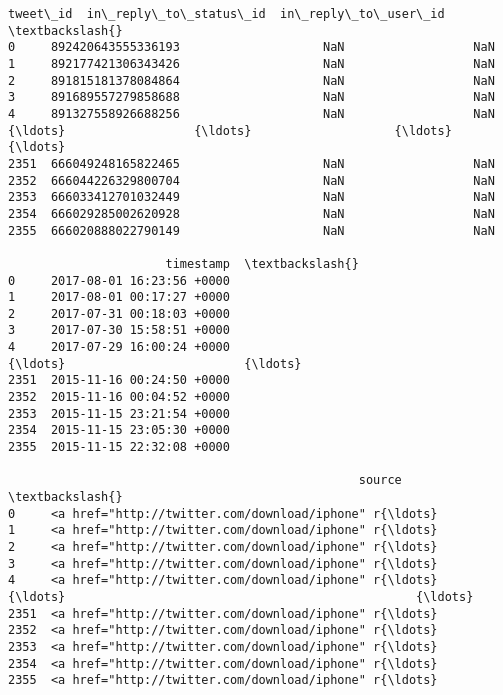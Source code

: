 \documentclass[11pt]{article}
\makeatletter
\newcommand{\boxspacing}{\kern\kvtcb@left@rule\kern\kvtcb@boxsep}
\newcommand{\prompt}[4]{
        {\ttfamily\llap{{\color{#2}[#3]:\hspace{3pt}#4}}\vspace{-\baselineskip}}
    }
\makeatother
\begin{document}
            \begin{tcolorbox}[breakable, size=fbox, boxrule=.5pt, pad at break*=1mm, opacityfill=0]
\prompt{Out}{outcolor}{7}{\boxspacing}
\begin{Verbatim}[commandchars=\\\{\}]
                tweet\_id  in\_reply\_to\_status\_id  in\_reply\_to\_user\_id  \textbackslash{}
0     892420643555336193                    NaN                  NaN
1     892177421306343426                    NaN                  NaN
2     891815181378084864                    NaN                  NaN
3     891689557279858688                    NaN                  NaN
4     891327558926688256                    NaN                  NaN
{\ldots}                  {\ldots}                    {\ldots}                  {\ldots}
2351  666049248165822465                    NaN                  NaN
2352  666044226329800704                    NaN                  NaN
2353  666033412701032449                    NaN                  NaN
2354  666029285002620928                    NaN                  NaN
2355  666020888022790149                    NaN                  NaN

                      timestamp  \textbackslash{}
0     2017-08-01 16:23:56 +0000
1     2017-08-01 00:17:27 +0000
2     2017-07-31 00:18:03 +0000
3     2017-07-30 15:58:51 +0000
4     2017-07-29 16:00:24 +0000
{\ldots}                         {\ldots}
2351  2015-11-16 00:24:50 +0000
2352  2015-11-16 00:04:52 +0000
2353  2015-11-15 23:21:54 +0000
2354  2015-11-15 23:05:30 +0000
2355  2015-11-15 22:32:08 +0000

                                                 source  \textbackslash{}
0     <a href="http://twitter.com/download/iphone" r{\ldots}
1     <a href="http://twitter.com/download/iphone" r{\ldots}
2     <a href="http://twitter.com/download/iphone" r{\ldots}
3     <a href="http://twitter.com/download/iphone" r{\ldots}
4     <a href="http://twitter.com/download/iphone" r{\ldots}
{\ldots}                                                 {\ldots}
2351  <a href="http://twitter.com/download/iphone" r{\ldots}
2352  <a href="http://twitter.com/download/iphone" r{\ldots}
2353  <a href="http://twitter.com/download/iphone" r{\ldots}
2354  <a href="http://twitter.com/download/iphone" r{\ldots}
2355  <a href="http://twitter.com/download/iphone" r{\ldots}


\end{Verbatim}
\end{tcolorbox}
\end{document}
